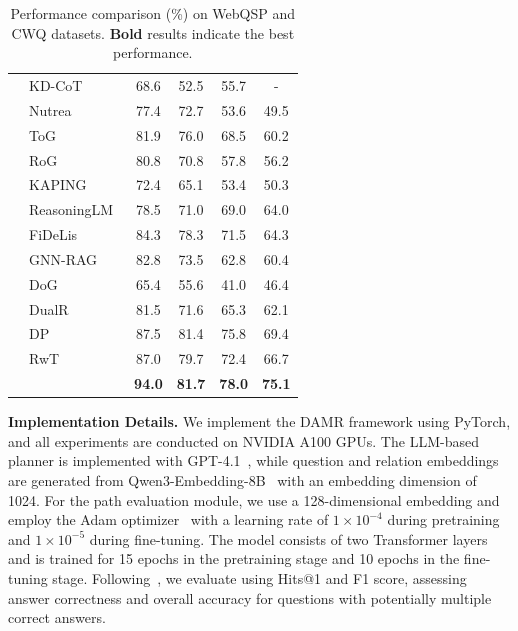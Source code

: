 \begin{table}[t]
\begin{tabular}{clcccc}
& KD-CoT~\cite{wang2023knowledge} & 68.6 & 52.5 & 55.7 & - \\
& Nutrea~\citep{choi2023nutrea} & 77.4 & 72.7 & 53.6 & 49.5 \\
& ToG~\citep{sun2023think} & 81.9 & 76.0 & 68.5 & 60.2 \\
& RoG~\citep{luo2023reasoning} & 80.8 & 70.8 & 57.8 & 56.2 \\
& KAPING~\citep{baek2023knowledge} & 72.4 & 65.1 & 53.4 & 50.3 \\
& ReasoningLM~\citep{jiang2023reasoninglm} & 78.5 & 71.0 & 69.0 & 64.0 \\
& FiDeLis~\citep{sui2024fidelis} & 84.3 & 78.3 & 71.5 & 64.3 \\
& GNN-RAG~\citep{mavromatis2024gnn} & 82.8 & 73.5 & 62.8 & 60.4 \\
& DoG~\citep{ma2025debate} & 65.4 & 55.6 & 41.0 & 46.4 \\
& DualR~\citep{liu2025dual} & 81.5 & 71.6 & 65.3 & 62.1 \\
& DP~\citep{ma2025deliberation} & {87.5} & {81.4} & {75.8} & {69.4} \\
& RwT~\citep{shen2025reasoning} & 87.0 & 79.7 & 72.4 & 66.7 \\
\midrule
& \method{} & \textbf{94.0} & \textbf{81.7} & \textbf{78.0} & \textbf{75.1} \\
\bottomrule
\end{tabular}
\vspace{-2pt}
\caption{Performance comparison (\%) on WebQSP and CWQ datasets. \textbf{Bold} results indicate the best performance.}

\label{tab:main_results}
\end{table}

\noindent\textbf{Implementation Details.} We implement the DAMR framework using PyTorch, and all experiments are conducted on NVIDIA A100 GPUs. The LLM-based planner is implemented with GPT-4.1~\citep{liu2023evaluating}, while question and relation embeddings are generated from Qwen3-Embedding-8B~\citep{yang2025qwen3} with an embedding dimension of 1024. For the path evaluation module, we use a 128-dimensional embedding and employ the Adam optimizer~\citep{kingma2014adam} with a learning rate of $1\times10^{-4}$ during pretraining and $1 \times 10^{-5}$ during fine-tuning. The model consists of two Transformer layers and is trained for 15 epochs in the pretraining stage and 10 epochs in the fine-tuning stage. Following~\citep{luo2023reasoning,yao2025learning,ma2025deliberation}, we evaluate \method{} using Hits@1 and F1 score, assessing answer correctness and overall accuracy for questions with potentially multiple correct answers.



